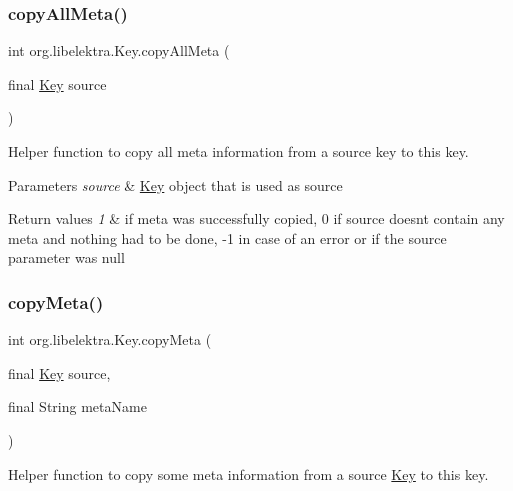 \subsubsection{\texorpdfstring{copy\+All\+Meta()}{copyAllMeta()}}
{\footnotesize\ttfamily int org.\+libelektra.\+Key.\+copy\+All\+Meta (\begin{DoxyParamCaption}\item[{final \hyperlink{classorg_1_1libelektra_1_1Key}{Key}}]{source }\end{DoxyParamCaption})\hspace{0.3cm}{\ttfamily [inline]}}



Helper function to copy all meta information from a source key to this key. 


\begin{DoxyParams}{Parameters}
{\em source} & \hyperlink{classorg_1_1libelektra_1_1Key}{Key} object that is used as source \\
\hline
\end{DoxyParams}

\begin{DoxyRetVals}{Return values}
{\em 1} & if meta was successfully copied, 0 if source doesn\textquotesingle{}t contain any meta and nothing had to be done, -\/1 in case of an error or if the source parameter was null \\
\hline
\end{DoxyRetVals}
\mbox{\label{classorg_1_1libelektra_1_1Key_a421a4240ce01f2f196bdce7b3c1d02c2}} 
\subsubsection{\texorpdfstring{copy\+Meta()}{copyMeta()}}
{\footnotesize\ttfamily int org.\+libelektra.\+Key.\+copy\+Meta (\begin{DoxyParamCaption}\item[{final \hyperlink{classorg_1_1libelektra_1_1Key}{Key}}]{source,  }\item[{final String}]{meta\+Name }\end{DoxyParamCaption})\hspace{0.3cm}{\ttfamily [inline]}}



Helper function to copy some meta information from a source \hyperlink{classorg_1_1libelektra_1_1Key}{Key} to this key. 


